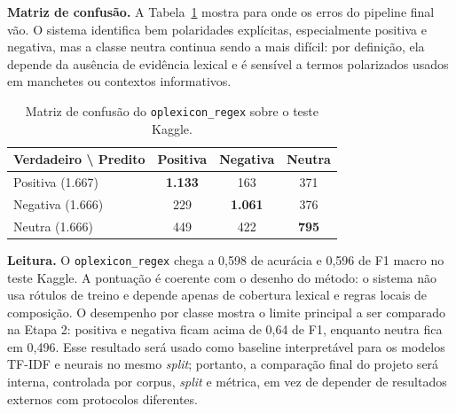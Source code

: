 \documentclass[11pt,a4paper]{article}
\newenvironment{addedblock}{\par\color{newblue}}{\par\color{black}}
\begin{document}
\begin{addedblock}
\textbf{Matriz de confusão.} A Tabela~\ref{tab:confusao} mostra para onde os erros do pipeline final vão. O sistema identifica bem polaridades explícitas, especialmente positiva e negativa, mas a classe neutra continua sendo a mais difícil: por definição, ela depende da ausência de evidência lexical e é sensível a termos polarizados usados em manchetes ou contextos informativos.

\begin{table}[h]
\small
\centering
\begin{tabular}{@{}lccc@{}}
\toprule
\textbf{Verdadeiro \textbackslash{} Predito} & \textbf{Positiva} & \textbf{Negativa} & \textbf{Neutra} \\
\midrule
Positiva (1.667) & \textbf{1.133} & 163 & 371 \\
Negativa (1.666) & 229 & \textbf{1.061} & 376 \\
Neutra (1.666)   & 449 & 422 & \textbf{795} \\
\bottomrule
\end{tabular}
\caption{Matriz de confusão do \texttt{oplexicon\_regex} sobre o teste Kaggle.}
\label{tab:confusao}
\end{table}

\textbf{Leitura.} O \texttt{oplexicon\_regex} chega a 0,598 de acurácia e 0,596 de F1 macro no teste Kaggle. A pontuação é coerente com o desenho do método: o sistema não usa rótulos de treino e depende apenas de cobertura lexical e regras locais de composição. O desempenho por classe mostra o limite principal a ser comparado na Etapa 2: positiva e negativa ficam acima de 0,64 de F1, enquanto neutra fica em 0,496. Esse resultado será usado como baseline interpretável para os modelos TF-IDF e neurais no mesmo \emph{split}; portanto, a comparação final do projeto será interna, controlada por corpus, \emph{split} e métrica, em vez de depender de resultados externos com protocolos diferentes.
\end{addedblock}
\end{document}
